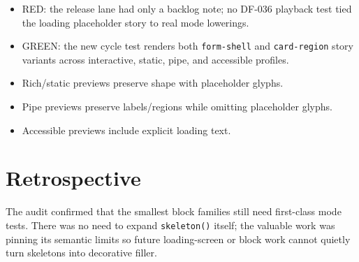 \begin{itemize}
\tightlist
\item
  RED: the release lane had only a backlog note; no DF-036 playback test tied the loading placeholder story to real mode lowerings.
\item
  GREEN: the new cycle test renders both \texttt{f\allowbreak{}o\allowbreak{}r\allowbreak{}m\allowbreak{}-\allowbreak{}s\allowbreak{}h\allowbreak{}e\allowbreak{}l\allowbreak{}l} and \texttt{c\allowbreak{}a\allowbreak{}r\allowbreak{}d\allowbreak{}-\allowbreak{}r\allowbreak{}e\allowbreak{}g\allowbreak{}i\allowbreak{}o\allowbreak{}n} story variants across interactive, static, pipe, and accessible profiles.
\item
  Rich/static previews preserve shape with placeholder glyphs.
\item
  Pipe previews preserve labels/regions while omitting placeholder glyphs.
\item
  Accessible previews include explicit loading text.
\end{itemize}

\section{Retrospective}\label{record-093-retrospective}

The audit confirmed that the smallest block families still need first-class mode tests. There was no need to expand \texttt{s\allowbreak{}k\allowbreak{}e\allowbreak{}l\allowbreak{}e\allowbreak{}t\allowbreak{}o\allowbreak{}n\allowbreak{}(\allowbreak{})} itself; the valuable work was pinning its semantic limits so future loading-screen or block work cannot quietly turn skeletons into decorative filler.

